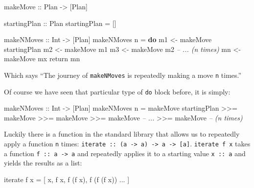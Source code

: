 \documentclass[]{article}
\newenvironment{Shaded}{}{}
\newcommand{\KeywordTok}[1]{\textcolor[rgb]{0.00,0.44,0.13}{\textbf{{#1}}}}
\newcommand{\DataTypeTok}[1]{\textcolor[rgb]{0.56,0.13,0.00}{{#1}}}
\newcommand{\CommentTok}[1]{\textcolor[rgb]{0.38,0.63,0.69}{\textit{{#1}}}}
\newcommand{\OtherTok}[1]{\textcolor[rgb]{0.00,0.44,0.13}{{#1}}}
\newcommand{\FunctionTok}[1]{\textcolor[rgb]{0.02,0.16,0.49}{{#1}}}
\newcommand{\NormalTok}[1]{{#1}}
\begin{document}
\begin{Shaded}
\begin{Highlighting}[]
\OtherTok{makeMove ::} \DataTypeTok{Plan} \OtherTok{->} \NormalTok{[}\DataTypeTok{Plan}\NormalTok{]}

\OtherTok{startingPlan ::} \DataTypeTok{Plan}
\NormalTok{startingPlan }\FunctionTok{=} \NormalTok{[]}

\OtherTok{makeNMoves ::} \DataTypeTok{Int} \OtherTok{->} \NormalTok{[}\DataTypeTok{Plan}\NormalTok{]}
\NormalTok{makeNMoves n }\FunctionTok{=} \KeywordTok{do}
    \NormalTok{m1 }\OtherTok{<-} \NormalTok{makeMove startingPlan}
    \NormalTok{m2 }\OtherTok{<-} \NormalTok{makeMove m1}
    \NormalTok{m3 }\OtherTok{<-} \NormalTok{makeMove m2}
    \CommentTok{-- ... (n times)}
    \NormalTok{mn }\OtherTok{<-} \NormalTok{makeMove mx}
    \NormalTok{return mn}
\end{Highlighting}
\end{Shaded}

Which says ``The journey of \texttt{makeNMoves} is repeatedly making a move
\texttt{n} times.''

Of course we have seen that particular type of \texttt{do} block before, it is
simply:

\begin{Shaded}
\begin{Highlighting}[]
\OtherTok{makeNMoves ::} \DataTypeTok{Int} \OtherTok{->} \NormalTok{[}\DataTypeTok{Plan}\NormalTok{]}
\NormalTok{makeNMoves n }\FunctionTok{=}
    \NormalTok{makeMove startingPlan }\FunctionTok{>>=} \NormalTok{makeMove}
        \FunctionTok{>>=} \NormalTok{makeMove }\FunctionTok{>>=} \NormalTok{makeMove   }\CommentTok{-- ...}
        \FunctionTok{>>=} \NormalTok{makeMove                }\CommentTok{-- (n times)}
\end{Highlighting}
\end{Shaded}

Luckily there is a function in the standard library that allows us to repeatedly
apply a function \texttt{n} times:
\texttt{iterate\ ::\ (a\ -\textgreater{}\ a)\ -\textgreater{}\ a\ -\textgreater{}\ {[}a{]}}.
\texttt{iterate\ f\ x} takes a function \texttt{f\ ::\ a\ -\textgreater{}\ a}
and repeatedly applies it to a starting value \texttt{x\ ::\ a} and yields the
results as a list:

\begin{Shaded}
\begin{Highlighting}[]
\NormalTok{iterate f x }\FunctionTok{=} \NormalTok{[ x, f x, f (f x), f (f (f x)) }\FunctionTok{...} \NormalTok{]}
\end{Highlighting}
\end{Shaded}
\end{document}
